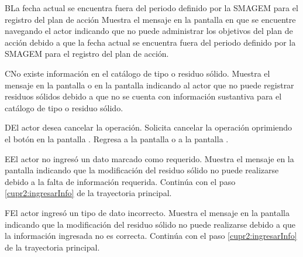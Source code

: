    \begin{UCtrayectoriaA}{B}{La fecha actual se encuentra fuera del periodo definido por la SMAGEM para el registro del plan de acción}
    \UCpaso[\UCsist] Muestra el mensaje  en la pantalla en que se encuentre navegando el actor indicando que no puede administrar los objetivos del plan de acción debido a que la fecha actual se encuentra fuera del periodo definido por la SMAGEM para el registro del plan de acción.
 \end{UCtrayectoriaA}
 
 \begin{UCtrayectoriaA}{C}{No existe información en el catálogo de tipo o residuo sólido.}
    \UCpaso[\UCsist] Muestra el mensaje  en la pantalla  o en la pantalla  indicando al actor que no puede registrar residuos sólidos debido a que no se cuenta con información sustantiva para el catálogo de tipo o residuo sólido.
 \end{UCtrayectoriaA}
 
    \begin{UCtrayectoriaA}{D}{El actor desea cancelar la operación.}
    \UCpaso[\UCactor] Solicita cancelar la operación oprimiendo el botón  en la pantalla .
    \UCpaso[\UCsist] Regresa a la pantalla  o a la pantalla . 
    \end{UCtrayectoriaA}
 
    \begin{UCtrayectoriaA}{E}{El actor no ingresó un dato marcado como requerido.}    
    \UCpaso[\UCsist] Muestra el mensaje  en la pantalla  indicando que la modificación del residuo sólido no puede realizarse debido a la falta de información requerida.
    \UCpaso[] Continúa con el paso \ref{cupr2:ingresarInfo} de la trayectoria principal.     
    \end{UCtrayectoriaA}
 
        \begin{UCtrayectoriaA}{F}{El actor ingresó un tipo de dato incorrecto.}    
    \UCpaso[\UCsist] Muestra el mensaje  en la pantalla  indicando que la modificación del residuo sólido no puede realizarse debido a que la información ingresada no es correcta.
    \UCpaso[] Continúa con el paso \ref{cupr2:ingresarInfo} de la trayectoria principal.     
    \end{UCtrayectoriaA}
    
